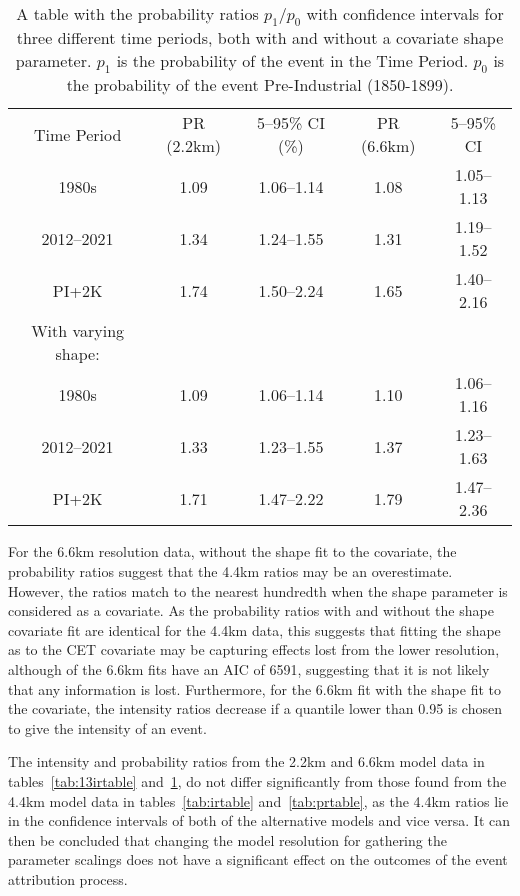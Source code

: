 \begin{table}[H]
   \centering
    \begin{tabular}{c c c c c}
        Time Period & PR (2.2km) & 5--95\% CI (\%) & PR (6.6km) & 5--95\% CI \\
        1980s & 1.09 & 1.06--1.14 & 1.08 & 1.05--1.13 \\
        2012--2021 & 1.34 & 1.24--1.55 & 1.31 & 1.19--1.52 \\
        PI+2K & 1.74 & 1.50--2.24 & 1.65 & 1.40--2.16 \\
        With varying shape: &&&& \\
        1980s & 1.09 & 1.06--1.14 & 1.10 & 1.06--1.16 \\
        2012--2021 & 1.33 & 1.23--1.55 & 1.37 & 1.23--1.63 \\
        PI+2K & 1.71 & 1.47--2.22 & 1.79 & 1.47--2.36 \\
    \end{tabular}
    \caption{A table with the probability ratios $p_1/p_0$ with confidence intervals for three different time periods,
        both with and without a covariate shape parameter.
    $p_1$ is the probability of the event in the Time Period.
    $p_0$ is the probability of the event Pre-Industrial (1850-1899).}
    \label{tab:13prtable}
\end{table}

For the 6.6km resolution data,
    without the shape fit to the covariate,
    the probability ratios suggest that the 4.4km ratios may be an overestimate.
However,
    the ratios match to the nearest hundredth when the shape parameter is considered as a covariate.
As the probability ratios with and without the shape covariate fit are identical for the 4.4km data,
    this suggests that fitting the shape as to the CET covariate may be capturing effects lost from the lower resolution,
    although of the 6.6km fits have an AIC of 6591, suggesting that it is not likely that any information is lost.
Furthermore, for the 6.6km fit with the shape fit to the covariate,
    the intensity ratios decrease if a quantile lower than 0.95 is chosen to give the intensity of an event.

The intensity and probability ratios from the 2.2km and 6.6km model data in tables~\ref{tab:13irtable} and~\ref{tab:13prtable},
    do not differ significantly from those found from the 4.4km model data in tables~\ref{tab:irtable} and~\ref{tab:prtable},
    as the 4.4km ratios lie in the confidence intervals of both of the alternative models and vice versa.
It can then be concluded that changing the model resolution for gathering the parameter scalings does not have a significant effect
     on the outcomes of the event attribution process.

